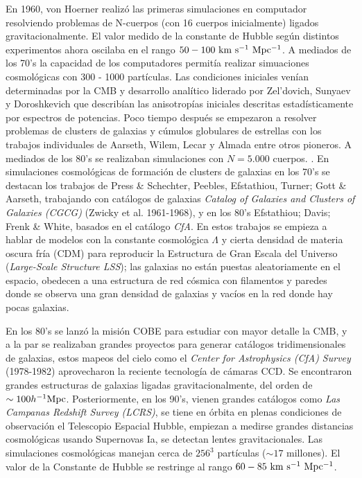\documentclass[preprint]{aastex62}
\begin{document}
  
  En 1960, von Hoerner realizó las primeras simulaciones en computador resolviendo problemas
  de N-cuerpos (con 16 cuerpos inicialmente) ligados gravitacionalmente. El valor medido de
  la constante de Hubble según distintos experimentos ahora oscilaba en el rango
  $50-100 \rm~km~s^{-1}~Mpc^{-1}$.  
  A mediados de los 70's la capacidad de los computadores permitía realizar simuaciones
  cosmológicas con 300 - 1000 partículas. Las condiciones iniciales venían determinadas por
  la CMB y desarrollo analítico liderado por Zel'dovich, Sunyaev y Doroshkevich
  que describían las anisotropías iniciales descritas estadísticamente por espectros de
  potencias. Poco tiempo después se empezaron a resolver problemas de clusters de galaxias
  y cúmulos globulares de estrellas
  con los trabajos individuales de Aarseth, Wilem, Lecar y Almada entre otros pioneros. A
  mediados de los 80's se realizaban simulaciones con $N = 5.000$ cuerpos.
  \citep{Aarseth2003, Press&Schechter1974}.
  En simulaciones cosmológicas de formación de clusters de galaxias en los 70's
  se destacan los trabajos de Press \& Schechter, Peebles, Efstathiou, Turner; Gott \& Aarseth,
  trabajando con catálogos de galaxias \textit{Catalog of Galaxies and Clusters of Galaxies
    (CGCG)} (Zwicky et al. 1961-1968), y en los 80's Efstathiou; Davis; Frenk \& White, basados
  en el catálogo \textit{CfA}. En estos trabajos se empieza a hablar de modelos con la
  constante cosmológica $\Lambda$ y cierta densidad de materia oscura fría (CDM) para reproducir
  la Estructura de Gran Escala del Universo  (\textit{Large-Scale
    Structure LSS}); las galaxias no están puestas aleatoriamente en el espacio, obedecen
  a una estructura de red cósmica con filamentos y paredes donde se observa una gran
  densidad de galaxias y vacíos en la red donde hay pocas galaxias. 
    
  En los 80's se lanzó la misión COBE para estudiar con mayor detalle la CMB,
  y a la par se realizaban grandes proyectos para generar catálogos tridimensionales de
  galaxias, estos mapeos del cielo como el \textit{Center for Astrophysics (CfA) Survey}
  (1978-1982) aprovecharon la reciente tecnología de cámaras CCD. Se encontraron grandes
  estructuras de galaxias ligadas gravitacionalmente, del orden de $\sim 100 h^{-1}\rm Mpc$.
  Posteriormente, en los 90's, vienen grandes catálogos como  \textit{Las Campanas Redshift
    Survey (LCRS)}, se tiene en órbita en plenas condiciones de observación el Telescopio
  Espacial Hubble, empiezan a medirse grandes distancias cosmológicas usando Supernovas Ia,
  se detectan lentes gravitacionales. Las simulaciones cosmológicas manejan cerca de
  $256^3$ partículas ($\sim 17$ millones). El valor de la Constante de Hubble se restringe
  al rango  $60-85 \rm~km~s^{-1}~Mpc^{-1}$.     \citep{Schneider2014}
  
\end{document}
